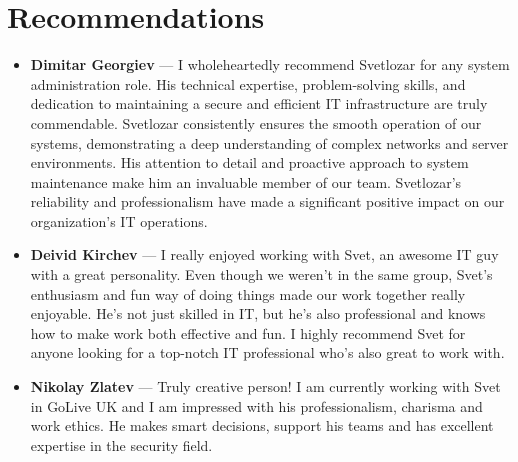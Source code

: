 \documentclass[letterpaper,6pt]{article}
\begin{document}
\begin{minipage}[t]{0.5\textwidth}
		\section*{Recommendations}
			\begin{itemize}
			\item {\textbf{Dimitar Georgiev} —  I wholeheartedly recommend Svetlozar for any system administration role. His technical expertise, problem-solving skills, and dedication to maintaining a secure and efficient IT infrastructure are truly commendable. Svetlozar consistently ensures the smooth operation of our systems, demonstrating a deep understanding of complex networks and server environments. His attention to detail and proactive approach to system maintenance make him an invaluable member of our team. Svetlozar's reliability and professionalism have made a significant positive impact on our organization's IT operations. }
			\item {\textbf{Deivid Kirchev}} — I  really enjoyed working with Svet, an awesome IT guy with a great personality. Even though we weren't in the same group, Svet's enthusiasm and fun way of doing things made our work together really enjoyable. He's not just skilled in IT, but he's also professional and knows how to make work both effective and fun. I highly recommend Svet for anyone looking for a top-notch IT professional who's also great to work with.
			\item {\textbf{Nikolay Zlatev}} — Truly creative person! I am currently working with Svet in GoLive UK and I am impressed with his professionalism, charisma and work ethics. He makes smart decisions, support his teams and has excellent expertise in the security field.
		\end{itemize}
	\end{minipage}
	
\end{document}
